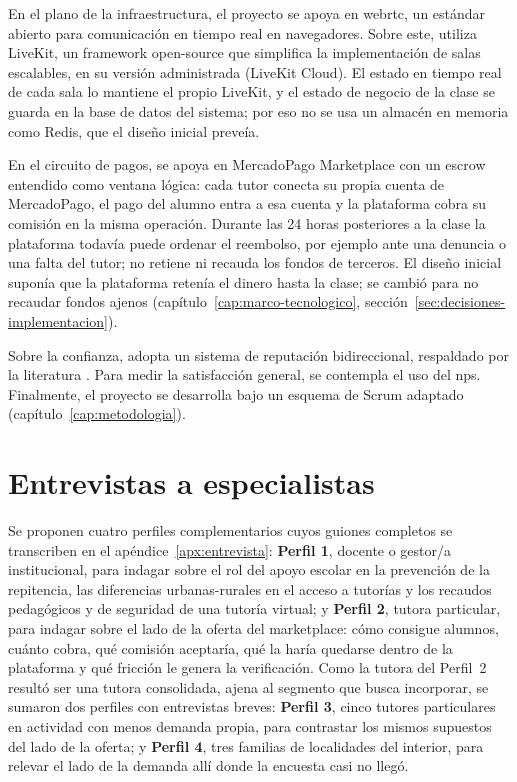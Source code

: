 En el plano de la infraestructura, el proyecto se apoya en \gls{webrtc},
un estándar abierto para comunicación en tiempo real en navegadores.
Sobre este, \sistema{} utiliza LiveKit, un framework open-source que
simplifica la implementación de salas escalables, en su versión
administrada (LiveKit Cloud). El estado en tiempo real de cada sala lo
mantiene el propio LiveKit, y el estado de negocio de la clase se guarda
en la base de datos del sistema; por eso no se usa un almacén en memoria
como Redis, que el diseño inicial preveía.

En el circuito de pagos, se apoya en MercadoPago Marketplace con un
\gls{escrow} entendido como ventana lógica: cada tutor conecta su propia
cuenta de MercadoPago, el pago del alumno entra a esa cuenta y la
plataforma cobra su comisión en la misma operación. Durante las 24 horas
posteriores a la clase la plataforma todavía puede ordenar el reembolso,
por ejemplo ante una denuncia o una falta del tutor; \sistema{} no
retiene ni recauda los fondos de terceros. El diseño inicial suponía que
la plataforma retenía el dinero hasta la clase; se cambió para no
recaudar fondos ajenos (capítulo~\ref{cap:marco-tecnologico},
sección~\ref{sec:decisiones-implementacion}).

Sobre la confianza, \sistema{} adopta un sistema de reputación
bidireccional, respaldado por la literatura \citep{reputation}. Para
medir la satisfacción general, se contempla el uso del \gls{nps}.
Finalmente, el proyecto se desarrolla bajo un esquema de Scrum adaptado
(capítulo~\ref{cap:metodologia}).

\section{Entrevistas a especialistas}\label{sec:entrevistas}

Se proponen cuatro perfiles complementarios cuyos guiones
completos se transcriben en el apéndice~\ref{apx:entrevista}:
\textbf{Perfil 1}, docente o gestor/a institucional, para indagar sobre
el rol del apoyo escolar en la prevención de la repitencia, las
diferencias urbanas-rurales en el acceso a tutorías y los recaudos
pedagógicos y de seguridad de una tutoría virtual; y \textbf{Perfil 2},
tutora particular, para indagar sobre el lado de la oferta del
\gls{marketplace}: cómo consigue alumnos, cuánto cobra, qué comisión
aceptaría, qué la haría quedarse dentro de la plataforma y qué fricción
le genera la verificación. Como la tutora del Perfil~2 resultó ser una
tutora consolidada, ajena al segmento que \sistema{} busca incorporar, se
sumaron dos perfiles con entrevistas breves: \textbf{Perfil 3}, cinco
tutores particulares en actividad con menos demanda propia, para
contrastar los mismos supuestos del lado de la oferta; y \textbf{Perfil
4}, tres familias de localidades del interior, para relevar el lado de
la demanda allí donde la encuesta casi no llegó.

